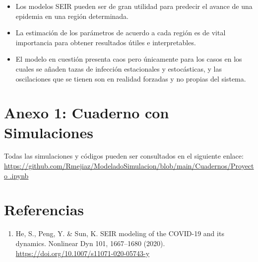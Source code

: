 \documentclass[conference]{IEEEtran}
\begin{document}
\begin{itemize}
\item Los modelos SEIR pueden ser de gran utilidad para predecir el avance de una epidemia en una región determinada.
\item La estimación de los parámetros de acuerdo a cada región es de vital importancia para obtener resultados útiles e interpretables.
\item El modelo en cuestión presenta caos pero únicamente para los casos en los cuales se añaden tazas de infección
      estacionales y estocásticas, y las oscilaciones que se tienen son en realidad forzadas y no propias del sistema.

\end{itemize}
\section*{Anexo 1: Cuaderno con Simulaciones}

Todas las simulaciones y códigos pueden ser consultados en el siguiente enlace: \href{https://github.com/Rmejiaz/ModeladoSimulacion/blob/main/Cuadernos/Proyecto.ipynb}{https://github.com/Rmejiaz/ModeladoSimulacion/blob/main/Cuadernos/Proyecto
.ipynb}


\section{Referencias}

\begin{enumerate}
    \item He, S., Peng, Y. \& Sun, K. SEIR modeling of the COVID-19 and its dynamics. Nonlinear Dyn 101, 1667–1680 (2020). \href{https://doi.org/10.1007/s11071-020-05743-y}{https://doi.org/10.1007/s11071-020-05743-y}
\end{enumerate}
\end{document}
